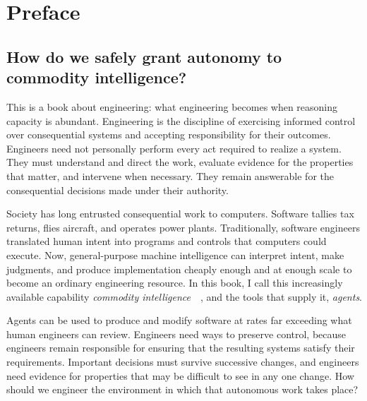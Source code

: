 



\chapter{Preface}

\section{How do we safely grant autonomy to commodity
intelligence?}\label{heading:how-do-we-safely-grant-autonomy-to-commodity-intelligence}

This is a book about engineering: what engineering becomes when
reasoning capacity is abundant. Engineering is the discipline of
exercising informed control over consequential systems and accepting
responsibility for their outcomes. Engineers need not personally perform
every act required to realize a system. They must understand and direct
the work, evaluate evidence for the properties that matter, and
intervene when necessary. They remain answerable for the consequential
decisions made under their authority.

Society has long entrusted consequential work to computers. Software
tallies tax returns, flies aircraft, and operates power plants.
Traditionally, software engineers translated human intent into programs
and controls that computers could execute. Now, general-purpose machine
intelligence can interpret intent, make judgments, and produce
implementation cheaply enough and at enough scale to become an ordinary
engineering resource. In this book, I call this increasingly available
capability \emph{commodity intelligence}~\citep{nosta2026commodity}~\citep{ling2026barrel},
and the tools that supply it, \emph{agents}.

Agents can be used to produce and modify software at rates far exceeding what human engineers can review.
Engineers need ways to preserve control, because engineers remain responsible for ensuring that the resulting systems satisfy their requirements.
Important decisions must survive successive changes, and engineers need evidence
for properties that may be difficult to see in any one change. How
should we engineer the environment in which that autonomous work takes
place?

